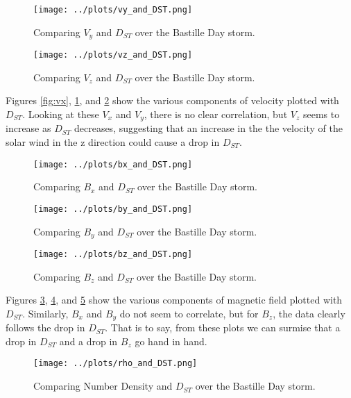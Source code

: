 \documentclass[12pt, letterpaper]{article}
\begin{document}
\begin{figure}[!ht]
  \centering
  \texttt{[image: ../plots/vy\_and\_DST.png]}
  \caption{Comparing $V_{y}$ and $D_{ST}$ over the Bastille Day storm.}
  \label{fig:vy}
\end{figure}

\begin{figure}[!ht]
  \centering
  \texttt{[image: ../plots/vz\_and\_DST.png]}
  \caption{Comparing $V_{z}$ and $D_{ST}$ over the Bastille Day storm.}
  \label{fig:vz}
\end{figure}

Figures \ref{fig:vx}, \ref{fig:vy}, and \ref{fig:vz} show the various components of velocity plotted with $D_{ST}$. Looking at these $V_{x}$ and $V_{y}$, there is no clear correlation, but $V_{z}$ seems to increase as $D_{ST}$ decreases, suggesting that an increase in the the velocity of the solar wind in the z direction could cause a drop in $D_{ST}$.



\begin{figure}[!ht]
  \centering
  \texttt{[image: ../plots/bx\_and\_DST.png]}
  \caption{Comparing $B_{x}$ and $D_{ST}$ over the Bastille Day storm.}
  \label{fig:bx}
\end{figure}

\begin{figure}[!ht]
  \centering
  \texttt{[image: ../plots/by\_and\_DST.png]}
  \caption{Comparing $B_{y}$ and $D_{ST}$ over the Bastille Day storm.}
  \label{fig:by}
\end{figure}

\begin{figure}[!ht]
  \centering
  \texttt{[image: ../plots/bz\_and\_DST.png]}
  \caption{Comparing $B_{z}$ and $D_{ST}$ over the Bastille Day storm.}
  \label{fig:bz}
\end{figure}

Figures \ref{fig:bx}, \ref{fig:by}, and \ref{fig:bz} show the various components of magnetic field plotted with $D_{ST}$. Similarly, $B_{x}$ and $B_{y}$ do not seem to correlate, but for $B_{z}$, the data clearly follows the drop in $D_{ST}$. That is to say, from these plots we can surmise that a drop in $D_{ST}$ and a drop in $B_{z}$ go hand in hand.



\begin{figure}[!ht]
  \centering
  \texttt{[image: ../plots/rho\_and\_DST.png]}
  \caption{Comparing Number Density and $D_{ST}$ over the Bastille Day storm.}
  \label{fig:rho}
\end{figure}
\end{document}
